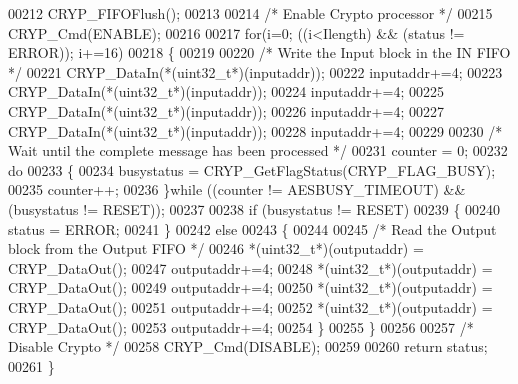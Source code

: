 \begin{DoxyCode}
00212   CRYP_FIFOFlush();
00213 
00214   \textcolor{comment}{/* Enable Crypto processor */}
00215   CRYP_Cmd(ENABLE);
00216 
00217   \textcolor{keywordflow}{for}(i=0; ((i<Ilength) && (status != ERROR)); i+=16)
00218   \{
00219 
00220     \textcolor{comment}{/* Write the Input block in the IN FIFO */}
00221     CRYP_DataIn(*(uint32\_t*)(inputaddr));
00222     inputaddr+=4;
00223     CRYP_DataIn(*(uint32\_t*)(inputaddr));
00224     inputaddr+=4;
00225     CRYP_DataIn(*(uint32\_t*)(inputaddr));
00226     inputaddr+=4;
00227     CRYP_DataIn(*(uint32\_t*)(inputaddr));
00228     inputaddr+=4;
00229 
00230     \textcolor{comment}{/* Wait until the complete message has been processed */}
00231     counter = 0;
00232     \textcolor{keywordflow}{do}
00233     \{
00234       busystatus = CRYP_GetFlagStatus(CRYP_FLAG_BUSY);
00235       counter++;
00236     \}\textcolor{keywordflow}{while} ((counter != AESBUSY_TIMEOUT) && (busystatus != RESET));
00237 
00238     \textcolor{keywordflow}{if} (busystatus != RESET)
00239    \{
00240        status = ERROR;
00241     \}
00242     \textcolor{keywordflow}{else}
00243     \{
00244 
00245       \textcolor{comment}{/* Read the Output block from the Output FIFO */}
00246       *(uint32\_t*)(outputaddr) = CRYP_DataOut();
00247       outputaddr+=4;
00248       *(uint32\_t*)(outputaddr) = CRYP_DataOut();
00249       outputaddr+=4;
00250       *(uint32\_t*)(outputaddr) = CRYP_DataOut();
00251       outputaddr+=4;
00252       *(uint32\_t*)(outputaddr) = CRYP_DataOut(); 
00253       outputaddr+=4;
00254     \}
00255   \}
00256 
00257   \textcolor{comment}{/* Disable Crypto */}
00258   CRYP_Cmd(DISABLE);
00259 
00260   \textcolor{keywordflow}{return} status; 
00261 \}
\end{DoxyCode}
